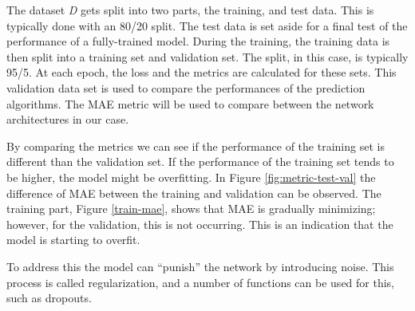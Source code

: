 \documentclass[11pt]{article}
\begin{document}
The dataset \textit{D} gets split into two parts, the training, and test data. This is typically done with an 80/20 split. The test data is set aside for a final test of the performance of a fully-trained model. During the training, the training data is then split into a training set and validation set. The split, in this case, is typically 95/5. At each epoch, the loss and the metrics are calculated for these sets. This validation data set is used to compare the performances of the prediction algorithms. The MAE metric will be used to compare between the network architectures in our case.

By comparing the metrics we can see if the performance of the training set is different than the validation set. If the performance of the training set tends to be higher, the model might be overfitting. In Figure \ref{fig:metric-test-val} the difference of MAE between the training and validation can be observed. The training part, Figure \ref{train-mae}, shows that MAE is gradually minimizing; however, for the validation, this is not occurring. This is an indication that the model is starting to overfit.

To address this the model can ``punish'' the network by introducing noise. This process is called regularization, and a number of functions can be used for this, such as dropouts.
\end{document}
